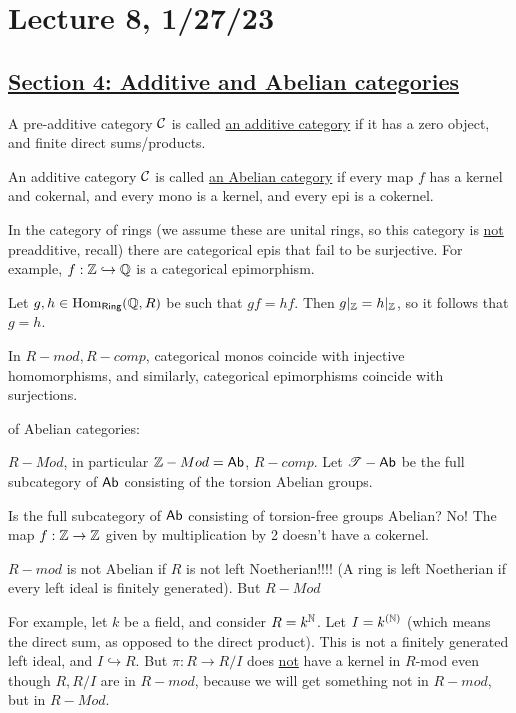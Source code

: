 \documentclass[x11names,reqno,14pt]{extarticle}
\begin{document}
\section*{Lecture 8, 1/27/23}

\subsection*{\underline{Section 4: Additive and Abelian categories}}


A pre-additive category $\mathcal{C}$ is called \underline{an additive category} if it has a zero object, and finite direct sums/products. 


An additive category $\mathcal{C}$ is called \underline{an Abelian category} if every map $f$ has a kernel and cokernal, and every mono is a kernel, and every epi is a cokernel. 

\exm

In the category of rings (we assume these are unital rings, so this category is \underline{not} preadditive, recall) there are categorical epis that fail to be surjective. For example, $f:\mathbb{Z}\hookrightarrow\mathbb{Q}$ is a categorical epimorphism. 

Let $g, h \in {\mathrm{Hom}}_{{{\text{\sffamily {Ring}}}}}(\mathbb{Q}, R)$ be such that $gf = hf$. Then $g|_{\mathbb{Z}} = h|_{\mathbb{Z}}$, so it follows that $g = h$.

In $R-mod, R-comp$, categorical monos coincide with injective homomorphisms, and similarly, categorical epimorphisms coincide with surjections. 

\exm of Abelian categories: 

$R-Mod$, in particular $\mathbb{Z}-Mod = {{\text{\sffamily {Ab}}}}$, $R-comp$. Let $\mathscr{T}-{{\text{\sffamily {Ab}}}}$ be the full subcategory of ${{\text{\sffamily {Ab}}}}$ consisting of the torsion Abelian groups. 

Is the full subcategory of ${{\text{\sffamily {Ab}}}}$ consisting of torsion-free groups Abelian? No! The map $f:\mathbb{Z}\to\mathbb{Z}$ given by multiplication by 2 doesn't have a cokernel. 

$R-mod$ is not Abelian if $R$ is not left Noetherian!!!! (A ring is left Noetherian if every left ideal is finitely generated). But $R-Mod$

For example, let $k$ be a field, and consider $R = k^{\mathbb{N}}$. Let $I = k^{(\mathbb{N})}$ (which means the direct sum, as opposed to the direct product). This is not a finitely generated left ideal, and $I \hookrightarrow R$. But $\pi:R\to R/I$ does \underline{not} have a kernel in $R$-mod even though $R, R/I$ are in $R-mod$, because we will get something not in $R-mod$, but in $R-Mod$. 
\end{document}
